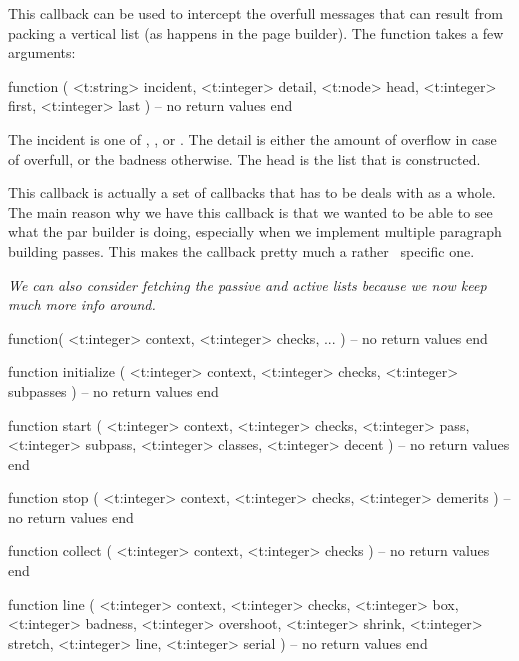 This callback can be used to intercept the overfull messages that can result from
packing a vertical list (as happens in the page builder). The function takes a
few arguments:

\starttyping[option=LUA]
function (
    <t:string>  incident,
    <t:integer> detail,
    <t:node>    head,
    <t:integer> first,
    <t:integer> last
)
    -- no return values
end
\stoptyping

The incident is one of , ,  or
. The detail is either the amount of overflow in case of \type
{overfull}, or the badness otherwise. The head is the list that is constructed.

\stopsubsection

\startsubsection[title=line_break]

This callback is actually a set of callbacks that has to be deals with as a
whole. The main reason why we have this callback is that we wanted to be able to
see what the par builder is doing, especially when we implement multiple
paragraph building passes. This makes the callback pretty much a rather \CONTEXT\
specific one.

{\em We can also consider fetching the passive and active lists because we now keep
much more info around.}

\starttyping[option=LUA]
function(
    <t:integer> context,
    <t:integer> checks,
    ...
)
    -- no return values
end
\stoptyping

\starttyping[option=LUA]
function initialize (
    <t:integer> context,
    <t:integer> checks,
    <t:integer> subpasses
)
    -- no return values
end
\stoptyping

\starttyping[option=LUA]
function start (
    <t:integer> context,
    <t:integer> checks,
    <t:integer> pass,
    <t:integer> subpass,
    <t:integer> classes,
    <t:integer> decent
)
    -- no return values
end
\stoptyping

\starttyping[option=LUA]
function stop (
    <t:integer> context,
    <t:integer> checks,
    <t:integer> demerits
)
    -- no return values
end
\stoptyping

\starttyping[option=LUA]
function collect (
    <t:integer> context,
    <t:integer> checks
)
    -- no return values
end
\stoptyping

\starttyping[option=LUA]
function line (
    <t:integer> context,
    <t:integer> checks,
    <t:integer> box,
    <t:integer> badness,
    <t:integer> overshoot,
    <t:integer> shrink,
    <t:integer> stretch,
    <t:integer> line,
    <t:integer> serial
)
    -- no return values
end
\stoptyping

